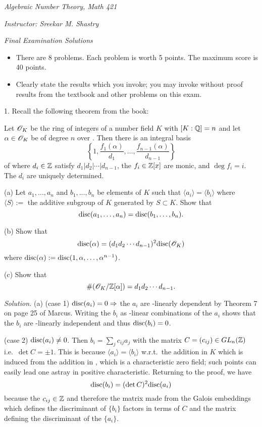 \documentclass[10pt,a4paper,reqno]{amsart}
\begin{document}


\noindent \textit{Algebraic Number Theory, Math 421}

\noindent \textit{Instructor: Sreekar M. Shastry}

\noindent \textit{Final Examination Solutions}

\bigskip

\begin{itemize}
\item There are 8 problems. Each problem is worth 5 points. The maximum score
  is 40 points.
\item Clearly state the results which you invoke; you may invoke without proof
  results from the textbook and other problems on this exam.
\end{itemize}

\bigskip

1. Recall the following theorem from the book:

Let $\mathscr{O}_K$ be the ring of integers of a number field $K$ with $[K:\mathbb{Q}] = n$ and
let $\alpha\in \mathscr{O}_K$ be of degree $n$ over \Q{}. Then there is an integral basis
\[\left\{ 1,\frac{f_1(\alpha)}{d_1}, \dots, \frac{f_{n-1}(\alpha)}{d_{n-1}}
\right\}\] of \OK{} where $d_i\in \mathbb{Z}$ satisfy $d_1|d_2|\cdots|d_{n-1}$, the
$f_i\in \mathbb{Z}[x]$ are monic, and $\deg f_i = i.$ The $d_i$ are uniquely
determined.

(a) Let $a_1,\dots,a_n$ and $b_1,\dots,b_n$ be elements of $K$ such that
$\langle a_i\rangle = \langle b_i\rangle$ where $\langle S\rangle := $ the
additive subgroup of $K$ generated by $S\subset K.$ Show that
\[\mathrm{disc}(a_1,\dots,a_n) = \mathrm{disc}(b_1,\dots,b_n).\]

(b) Show that \[\mathrm{disc}(\alpha) = (d_1 d_2\cdots d_{n-1})^2 \mathrm{disc}(\mathscr{O}_K)\] where
$\mathrm{disc}(\alpha) := \mathrm{disc}(1,\alpha,\dots,\alpha^{n-1})$.

(c) Show that \[ \#(\mathscr{O}_K/\mathbb{Z}[\alpha]) = d_1 d_2\cdots d_{n-1}.\]

\bigskip

\emph{Solution.} (a) (case 1) $\mathrm{disc}(a_i)=0 \Rightarrow$ the $a_i$ are
\Q{}-linearly dependent by Theorem 7 on page 25 of Marcus. Writing the $b_i$
as \Z-linear combinations of the $a_i$ shows that the $b_i$ are \Q{}-linearly
independent and thus $\mathrm{disc}(b_i)=0$.

(case 2) $\mathrm{disc}(a_i)\neq 0$. Then $b_i = \sum_{j} c_{ij} a_j$ with the matrix
$C = (c_{ij}) \in GL_n(\mathbb{Z})$ i.e.~$\det C = \pm 1$. This is because $\langle
a_i\rangle = \langle b_i\rangle$ w.r.t.~the addition in $K$ which is induced
from the addition in \C{}, which is a characteristic zero field; such points
can easily lead one astray in positive characteristic. Returning to the proof,
we have \[\mathrm{disc}(b_i) = (\det C)^2 \mathrm{disc}(a_i)\] because the $c_{ij} \in \mathbb{Z}$ and
therefore the matrix made from the Galois embeddings which defines the
discriminant of $\{b_i\}$ factors in terms of $C$ and the matrix defining the
discriminant of the $\{a_i\}.$
\end{document}

